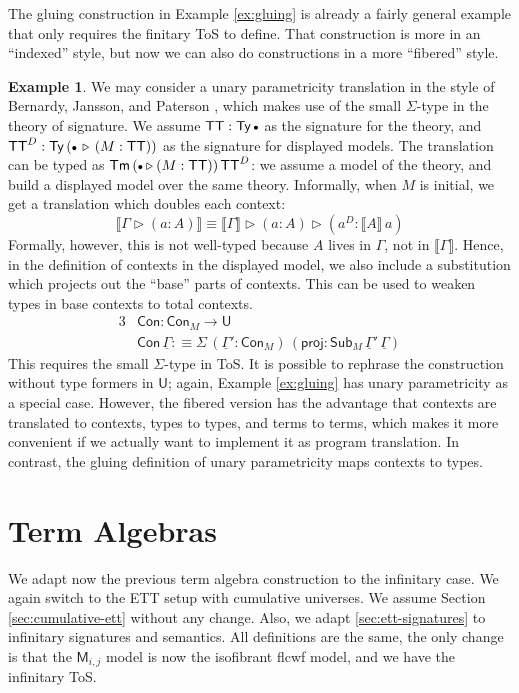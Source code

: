 \documentclass[12pt,a4paper,twoside,openany]{book}
\theoremstyle{remark}
\theoremstyle{definition}
\newtheorem{myexample}{Example}
\theoremstyle{theorem}
\newcommand{\ms}[1]{\mathsf{#1}}
\newcommand{\bs}[1]{\boldsymbol{#1}}
\newcommand{\Con}{\mathsf{Con}}
\newcommand{\Sub}{\mathsf{Sub}}
\newcommand{\Tm}{\mathsf{Tm}}
\newcommand{\Ty}{\mathsf{Ty}}
\newcommand{\U}{\mathsf{U}}
\newcommand{\proj}{\mathsf{proj}}
\newcommand{\ext}{\triangleright}
\newcommand{\emptycon}{\scaleobj{.75}\bullet}
\newcommand{\bM}{\bs{\mathsf{M}}}
\newcommand{\ul}[1]{\underline{#1}}
\newcommand{\ulGamma}{\ul{\Gamma}}
\newcommand{\llb}{\llbracket}
\newcommand{\rrb}{\rrbracket}
\newcommand{\sem}[1]{\llb#1\rrb}
\newcommand{\defn}{:\equiv}
\begin{document}
The gluing construction in Example \ref{ex:gluing} is already a fairly general
example that only requires the finitary ToS to define. That construction is more
in an ``indexed'' style, but now we can also do constructions in a more
``fibered'' style.

\begin{myexample}
\label{ex:param-translation}
We may consider a unary parametricity translation in the style of Bernardy,
Jansson, and Paterson \cite{bernardy12parametricity}, which makes use of the
small $\Sigma$-type in the theory of signature. We assume $\ms{TT} :
\Ty\,\emptycon$ as the signature for the theory, and $\ms{TT}^D :
\Ty\,(\emptycon\,\ext\,(M : \ms{TT}))$ as the signature for displayed models.
The translation can be typed as $\Tm\,(\emptycon\ext (M : \ms{TT}))\,\ms{TT}^D$:
we assume a model of the theory, and build a displayed model over the same
theory. Informally, when $M$ is initial, we get a translation which doubles each
context:
\[
  \sem{\Gamma \ext (a : A)} \equiv \sem{\Gamma} \ext (a : A) \ext (a^D : \sem{A}\,a)
\]
Formally, however, this is not well-typed because $A$ lives in $\Gamma$, not in
$\sem{\Gamma}$. Hence, in the definition of contexts in the displayed model, we
also include a substitution which projects out the ``base'' parts of contexts.
This can be used to weaken types in base contexts to total contexts.
\begin{alignat*}{3}
  &\Con : \Con_{M} \to \U\\
  &\Con\,\ulGamma \defn \Sigma\,(\ulGamma' : \Con_M)\,(\proj : \Sub_M\,\ulGamma'\,\ulGamma)
\end{alignat*}
This requires the small $\Sigma$-type in ToS. It is possible to rephrase the
construction without type formers in $\U$; again, Example \ref{ex:gluing} has unary
parametricity as a special case. However, the fibered version has the advantage
that contexts are translated to contexts, types to types, and terms to terms,
which makes it more convenient if we actually want to implement it as program
translation. In contrast, the gluing definition of unary parametricity maps
contexts to types.
\end{myexample}


\section{Term Algebras}
\label{sec:inf-term-algebras}

We adapt now the previous term algebra construction to the infinitary
case. We again switch to the ETT setup with cumulative universes. We
assume Section \ref{sec:cumulative-ett} without any change. Also, we adapt
\ref{sec:ett-signatures} to infinitary signatures and semantics. All definitions
are the same, the only change is that the $\bM_{i,j}$ model is now the
isofibrant flcwf model, and we have the infinitary ToS.
\end{document}

